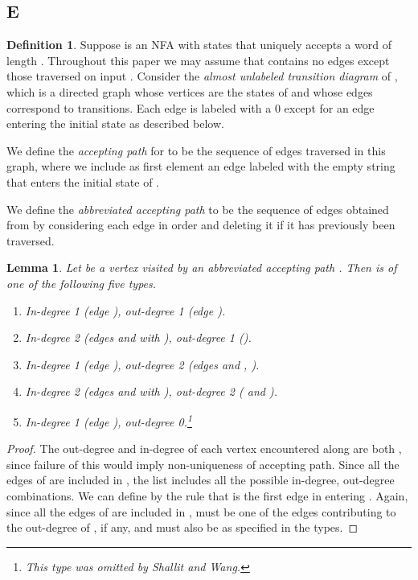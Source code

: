 \documentclass[12pt]{article}
\theoremstyle{plain}
\newtheorem{lem}[thm]{Lemma}
\theoremstyle{definition}
\newtheorem{df}[thm]{Definition}
\theoremstyle{remark}
\begin{document}
		\subsection{E}
			\begin{df}
				Suppose  is an NFA with  states that uniquely accepts a word  of length .
				Throughout this paper we may assume that  contains no edges except those
				traversed on input .
				Consider the \emph{almost unlabeled transition diagram} of , which is
				a directed graph whose vertices are the states of 
				and whose edges correspond to transitions.
				Each edge is labeled with a 0 except for an edge entering the initial state as described below.

				We define the \emph{accepting path}  for  to be the sequence of  edges traversed in this graph,
				where we include as first element an edge labeled with the empty string  that enters the initial state  of .

				We define the \emph{abbreviated accepting path}  to be the sequence of edges obtained from  by considering each edge
				in order and deleting it if it has previously been traversed.
			\end{df}
			\begin{lem}\label{types}
				Let  be a vertex visited by an abbreviated accepting path .
				Then  is of one of the following five types.
				\begin{enumerate}
					\item In-degree 1 (edge ), out-degree 1 (edge ).
					\item In-degree 2 (edges  and  with ), out-degree 1 ().
					\item In-degree 1 (edge ), out-degree 2 (edges  and , ).
					\item In-degree 2 (edges  and  with ), out-degree 2 ( and ).
					\item In-degree 1 (edge ), out-degree 0.\footnote{This type was omitted by Shallit and Wang.}
				\end{enumerate}
			\end{lem}
			\begin{proof}
				The out-degree and in-degree of each vertex encountered along  are both ,
				since failure of this would imply non-uniqueness of accepting path.
				Since all the edges of  are included in , the list includes all the possible in-degree, out-degree combinations.
				We can define  by the rule that  is the first edge in  entering .
				Again, since all the edges of  are included in ,
				 must be one of the edges contributing to the out-degree of , if any,
				and  must also be as specified in the types.
			\end{proof}
\end{document}
